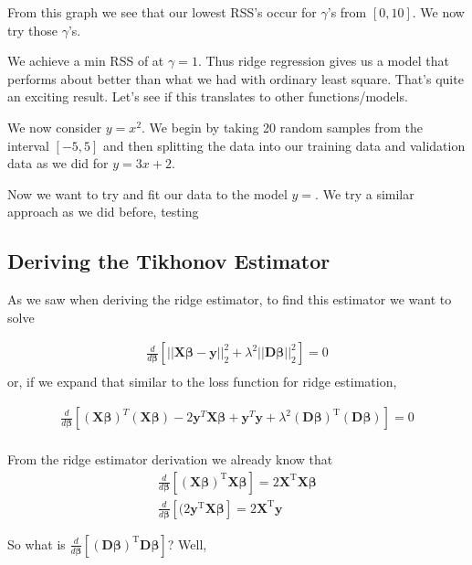 \documentclass{article}
\newcommand{\y}{\mathbf{y}}
\newcommand{\X}{\mathbf{X}}
\newcommand{\B}{\boldsymbol\beta} %
\newcommand{\D}{\mathbf{D}}
\begin{document}
From this graph we see that our lowest RSS's occur for $\gamma$'s from $[0,10]$. We now try those $\gamma$'s. 

We achieve a min RSS of at $\gamma = 1$. Thus ridge regression gives us a model that performs about %
better than what we had with ordinary least square. That's quite an exciting result. Let's see if this translates to other functions/models.


We now consider $y = x^2$. We begin by taking 20 random samples from the interval $[-5,5]$ and then splitting the data into our training data and validation
data as we did for $y = 3x + 2$. 

Now we want to try and fit our data to the model $y = $. We try a similar approach as we did before, testing 
\subsection{Deriving the Tikhonov Estimator}

As we saw when deriving the ridge estimator, to find this estimator we want to solve

\begin{align*}
\frac{d}{d\B} \left[ ||\X\B-\y||_{2}^{2} + \lambda^2||\D \B||_{2}^{2} \right] = 0 \\
\end{align*}
or, if we expand that similar to the loss function for ridge estimation, 

\begin{align*}
\frac{d}{d\B} \left[ (\X\B)^T(\X\B) -2 \y^T \X\B + \y^T \y + \lambda^2(\D\B)^{\textrm{T}}(\D\B) \right] = 0 \\
\end{align*}

From the ridge estimator derivation we already know that 
\begin{align*}
\frac{d}{d\B} [ (\X\B)^{\textrm{T}} \X\B ] = 2\X^{\textrm{T}}\X\B \\
\frac{d}{d\B} [ (2\y^{\textrm{T}} \X\B ] = 2\X^{\textrm{T}}\y
\end{align*}

So what is $\frac{d}{d\B} [ (\D\B)^{\textrm{T}}\D\B ] $? Well, 
\end{document}

